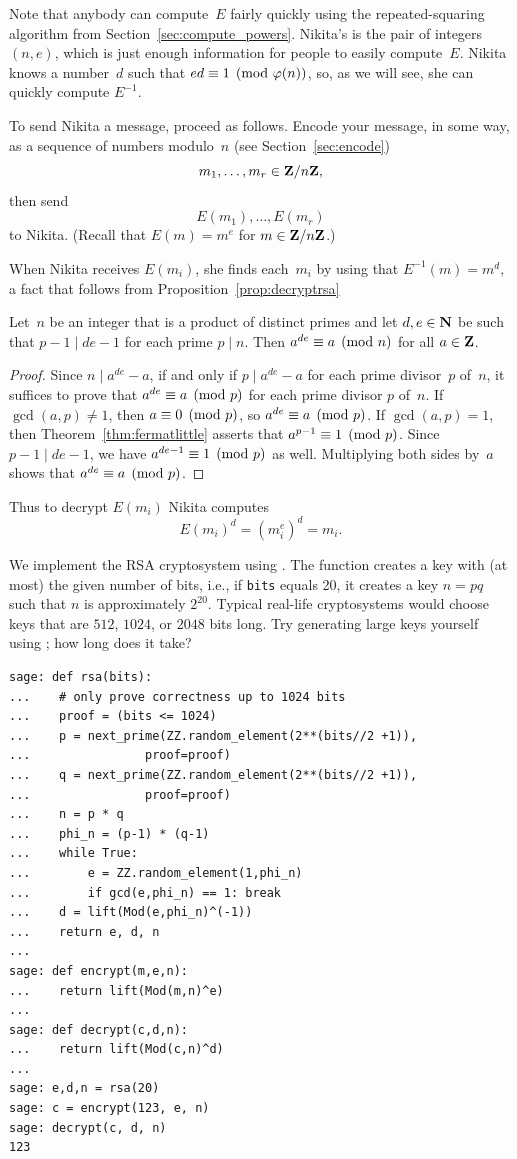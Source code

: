 Note that anybody can compute~$E$ fairly quickly using the
repeated-squaring algorithm from Section~\ref{sec:compute_powers}.
Nikita's  is the pair of integers $(n,e)$, which is
just enough information for people to easily compute~$E$.  Nikita
knows a number~$d$ such that $ed\equiv 1\pmod{\varphi(n)}$, so, as we will
see, she can quickly compute $E^{-1}$.

To send Nikita a message, proceed as follows.
Encode your message, in some way, as a sequence
of numbers modulo~$n$ (see Section~\ref{sec:encode})
$$
  m_1, \ldots, m_r \in \mathbf{Z}/n\mathbf{Z}{},
$$
then send
$$
  E(m_1), \ldots, E(m_r)
$$
to Nikita.   (Recall that $E(m) = m^e$ for $m\in \mathbf{Z}/n\mathbf{Z}{}$.)

When Nikita receives $E(m_i)$, she finds each~$m_i$ by
using that
$
 E^{-1}(m) = m^d,
$
a fact that follows from Proposition~\ref{prop:decryptrsa}
\begin{proposition}\label{prop:decryptrsa}
Let~$n$ be an integer that is a product of distinct primes
and let $d,e\in\mathbf{N}$ be such that $p-1\mid de-1$ for each prime $p\mid n$.  Then
$a^{de} \equiv a\pmod{n}$ for all $a\in\mathbf{Z}$.
\end{proposition}
\begin{proof}
Since $n\mid a^{de}-a$, if and only if $p\mid a^{de}-a$ for each prime
divisor~$p$ of~$n$, it suffices to prove that $a^{de}\equiv a\pmod{p}$ for
each prime divisor $p$ of~$n$.  If $\gcd(a,p)\neq 1$,
then $a\equiv 0\pmod{p}$, so $a^{de} \equiv a\pmod{p}$.
If $\gcd(a,p)=1$, then Theorem~\ref{thm:fermatlittle}
asserts that $a^{p-1}\equiv 1\pmod{p}$.
Since $p-1\mid de-1$, we have $a^{de-1} \equiv 1\pmod{p}$
as well.  Multiplying both sides
by~$a$ shows that $a^{de}\equiv a\pmod{p}$.
\end{proof}
Thus to decrypt $E(m_i)$ Nikita computes
$$
  E(m_i)^d = (m_i^{e})^{d}=m_i.
$$

\begin{sg}
  We implement the RSA cryptosystem using \sage.  The 
  function creates a key with (at most) the given number of
  bits, i.e., if {\tt bits} equals 20, it creates a key $n=pq$ such
  that $n$ is approximately $2^{20}$.  Typical real-life cryptosystems
  would choose keys that are $512$, $1024$, or $2048$ bits long.  Try
  generating large keys yourself using \sage; how long does it
  take?

\begin{verbatim}
sage: def rsa(bits):
...    # only prove correctness up to 1024 bits
...    proof = (bits <= 1024)
...    p = next_prime(ZZ.random_element(2**(bits//2 +1)),
...                proof=proof)
...    q = next_prime(ZZ.random_element(2**(bits//2 +1)),
...                proof=proof)
...    n = p * q
...    phi_n = (p-1) * (q-1)
...    while True:
...        e = ZZ.random_element(1,phi_n)
...        if gcd(e,phi_n) == 1: break
...    d = lift(Mod(e,phi_n)^(-1))
...    return e, d, n
...
sage: def encrypt(m,e,n):
...    return lift(Mod(m,n)^e)
...
sage: def decrypt(c,d,n):
...    return lift(Mod(c,n)^d)
...
sage: e,d,n = rsa(20)
sage: c = encrypt(123, e, n)
sage: decrypt(c, d, n)
123
\end{verbatim}
\end{sg}

